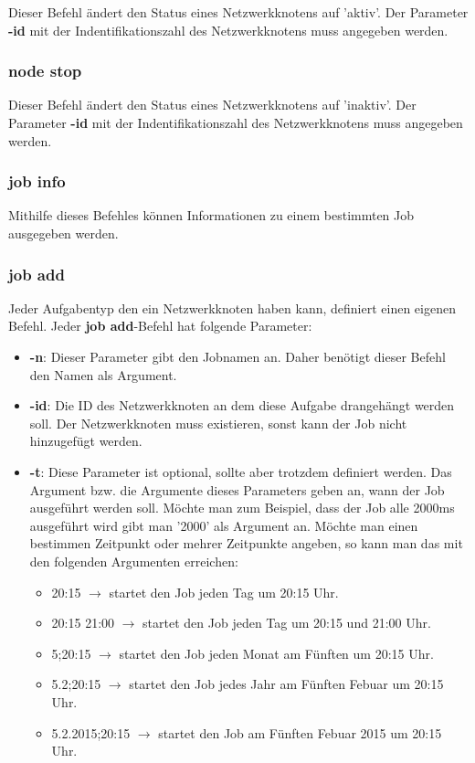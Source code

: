 \documentclass[12pt,a4paper]{report}
\begin{document}
\begin{onehalfspace}
Dieser Befehl ändert den Status eines Netzwerkknotens auf 'aktiv'. Der Parameter \textbf{-id} mit der Indentifikationszahl des Netzwerkknotens muss angegeben werden.

\subsubsection{node stop}

Dieser Befehl ändert den Status eines Netzwerkknotens auf 'inaktiv'. Der Parameter \textbf{-id} mit der Indentifikationszahl des Netzwerkknotens muss angegeben werden.

\subsubsection{job info}

Mithilfe dieses Befehles können Informationen zu einem bestimmten Job ausgegeben werden.

\subsubsection{job add}

Jeder Aufgabentyp den ein Netzwerkknoten haben kann, definiert einen eigenen Befehl. Jeder \textbf{job add}-Befehl hat folgende Parameter:

\begin{itemize}
\item \textbf{-n}: Dieser Parameter gibt den Jobnamen an. Daher benötigt dieser Befehl den Namen als Argument.
\item \textbf{-id}: Die ID des Netzwerkknoten an dem diese Aufgabe drangehängt werden soll. Der Netzwerkknoten muss existieren, sonst kann der Job nicht hinzugefügt werden.
\item \textbf{-t}: Diese Parameter ist optional, sollte aber trotzdem definiert werden. Das Argument bzw. die Argumente dieses Parameters geben an, wann der Job ausgeführt werden soll. Möchte man zum Beispiel, dass der Job alle 2000ms ausgeführt wird gibt man '2000' als Argument an. Möchte man einen bestimmen Zeitpunkt oder mehrer Zeitpunkte angeben, so kann man das mit den folgenden Argumenten erreichen:
  \begin{itemize}
  \item 20:15 $\rightarrow$ startet den Job jeden Tag um 20:15 Uhr.
  \item 20:15 21:00 $\rightarrow$ startet den Job jeden Tag um 20:15 und 21:00 Uhr.
  \item 5;20:15 $\rightarrow$ startet den Job jeden Monat am Fünften um 20:15 Uhr.
  \item 5.2;20:15 $\rightarrow$ startet den Job jedes Jahr am Fünften Febuar um 20:15 Uhr.
  \item 5.2.2015;20:15 $\rightarrow$ startet den Job am Fünften Febuar 2015 um 20:15 Uhr.
  \end{itemize}
\end{itemize}


\end{onehalfspace}
\end{document}
